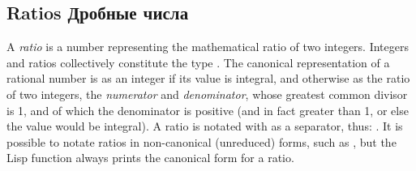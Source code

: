 \subsection{Ratios Дробные числа}

A {\it ratio} is a number representing the mathematical ratio
of two integers.  Integers and ratios collectively constitute
the type .
The canonical representation of a rational number is as an
integer if its value is integral, and otherwise as the ratio of two
integers, the {\it numerator} and {\it denominator}, whose greatest
common divisor is 1, and of which the denominator is positive (and in
fact greater than 1, or else the value would be integral).
A ratio is notated with
\cd{/} as a separator, thus: .  It is possible to notate
ratios in non-canonical (unreduced) forms, such as , but the
Lisp function  always prints the canonical form for a
ratio.

